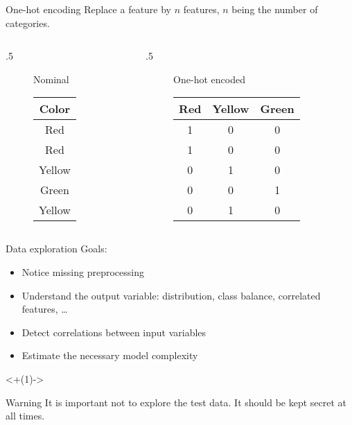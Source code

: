 \begin{frame}{One-hot encoding}
  Replace a feature by $n$ features, $n$ being the number of categories.
  \begin{columns}
    \begin{column}{.5\tw}
      \begin{figure}
        \centering
        Nominal\\[.5cm]
        \begin{tabular}{c}
          \toprule
          Color \\
          \midrule
          Red \\
          Red \\
          Yellow \\
          Green \\
          Yellow \\
          \bottomrule
        \end{tabular}
      \end{figure}
    \end{column}
    \begin{column}{.5\tw}
      \begin{figure}
        \centering
        One-hot encoded\\[.5cm]
        \begin{tabular}{ccc}
          \toprule
          Red & Yellow & Green \\
          \midrule
          1 & 0 & 0 \\
          1 & 0 & 0 \\
          0 & 1 & 0 \\
          0 & 0 & 1 \\
          0 & 1 & 0 \\
          \bottomrule
        \end{tabular}
      \end{figure}
    \end{column}
  \end{columns}
\end{frame}

\begin{frame}{Data exploration}
  Goals:
  \begin{itemize}[<+(1)->]
  \item Notice missing preprocessing
  \item Understand the output variable: distribution, class balance, correlated features, …
  \item Detect correlations between input variables
  \item Estimate the necessary model complexity
  \end{itemize}

  \onslide<+(1)->{
    \begin{alertblock}{Warning}
      It is important not to explore the test data. It should be kept secret at all times.
    \end{alertblock}
  }
\end{frame}


